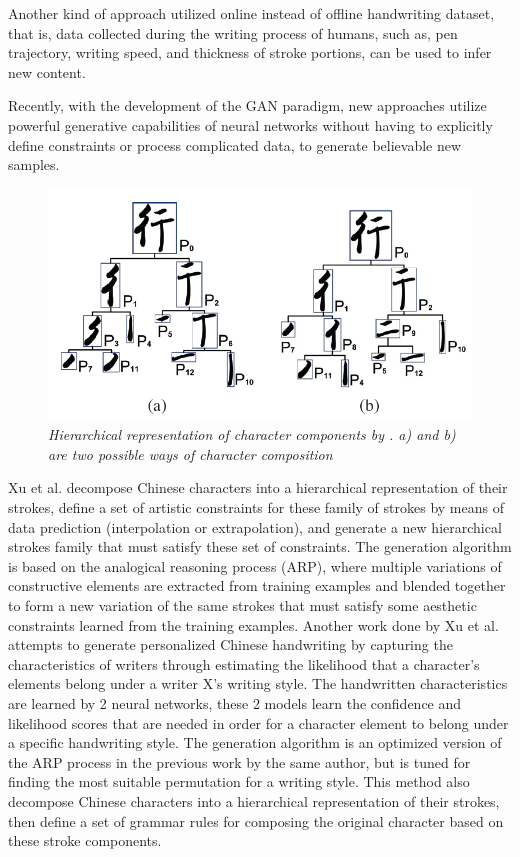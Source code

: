 \documentclass[12pt]{report}
\begin{document}
Another kind of approach utilized online instead of offline handwriting dataset, that is, data collected during the writing process of humans, such as, pen trajectory, writing speed, and thickness of stroke portions, can be used to infer new content.

Recently, with the development of the GAN paradigm, new approaches utilize powerful generative capabilities of neural networks without having to explicitly define constraints or process complicated data, to generate believable new samples.

\begin{figure}[h]
	\centering
	\includegraphics[scale=0.7]{hierarch-comp}
	\caption{\textit{Hierarchical representation of character components by \cite{handwritten-font}. a) and b) are two possible ways of character composition}}
	\label{fig:hierarch-comp}
\end{figure}

Xu et al.\cite{automatic-calligraphy} decompose Chinese characters into a hierarchical representation of their
strokes, define a set of artistic constraints for these family of strokes by means of data prediction (interpolation or extrapolation), and generate a new hierarchical strokes family that must satisfy these set of constraints. The generation algorithm is based on the analogical reasoning process (ARP), where multiple variations of constructive elements are extracted from training examples and blended together to form a new variation of the same strokes that must satisfy some aesthetic constraints learned from the training examples. Another work done by Xu et al.\cite{automatic-handwritten} attempts to generate personalized Chinese handwriting by capturing the characteristics of writers through estimating the likelihood that a character's elements belong under a writer X’s writing style. The handwritten characteristics are learned by 2 neural networks, these 2 models learn the confidence and likelihood scores that are needed in order for a character element to belong under a specific handwriting style. The generation algorithm is an optimized version of the ARP process in the previous work by the same author, but is tuned for finding the most suitable permutation for a writing style. This method also decompose Chinese characters into a hierarchical representation of their strokes, then define a set of grammar rules for composing the original character based on these stroke components.
\end{document}
